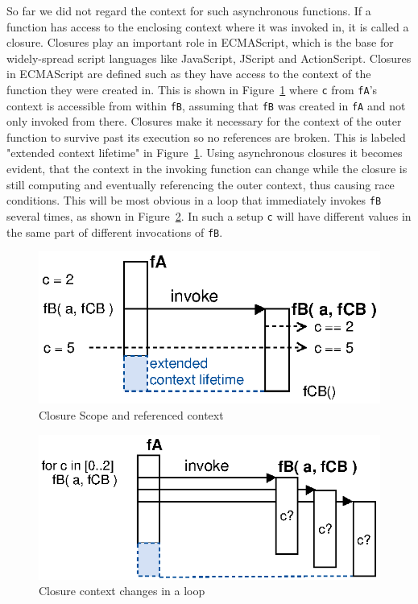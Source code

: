 So far we did not regard the context for such asynchronous functions.
If a function has access to the enclosing context where it was invoked in, it is called a closure.
Closures play an important role in \textrm{ECMAScript}\cite{EcmaScript}, which is the base for widely-spread script languages like JavaScript, JScript and ActionScript.
Closures in \textrm{ECMAScript} are defined such as they have access to the context of the function they were created in.
This is shown in Figure~\ref{fig:Closures_Closure-1} where \texttt{c} from \texttt{fA}'s context is accessible from within \texttt{fB}, assuming that \texttt{fB} was created in \texttt{fA} and not only invoked from there.
Closures make it necessary for the context of the outer function to survive past its execution so no references are broken.
This is labeled "extended context lifetime" in Figure~\ref{fig:Closures_Closure-1}.
Using asynchronous closures it becomes evident, that the context in the invoking function can change while the closure is still computing and eventually referencing the outer context, thus causing race conditions.
This will be most obvious in a loop that immediately invokes \texttt{fB} several times, as shown in Figure~\ref{fig:Closures_Closure-2}.
In such a setup \texttt{c} will have different values in the same part of different invocations of \texttt{fB}.
\begin{figure}[!ht]
	\centering
  \includegraphics{figures/Closures_Closure-1}
	\caption{Closure Scope and referenced context}
	\label{fig:Closures_Closure-1}
\end{figure}
\begin{figure}[!ht]
	\centering
  \includegraphics{figures/Closures_Closure-2}
	\caption{Closure context changes in a loop}
	\label{fig:Closures_Closure-2}
\end{figure}


